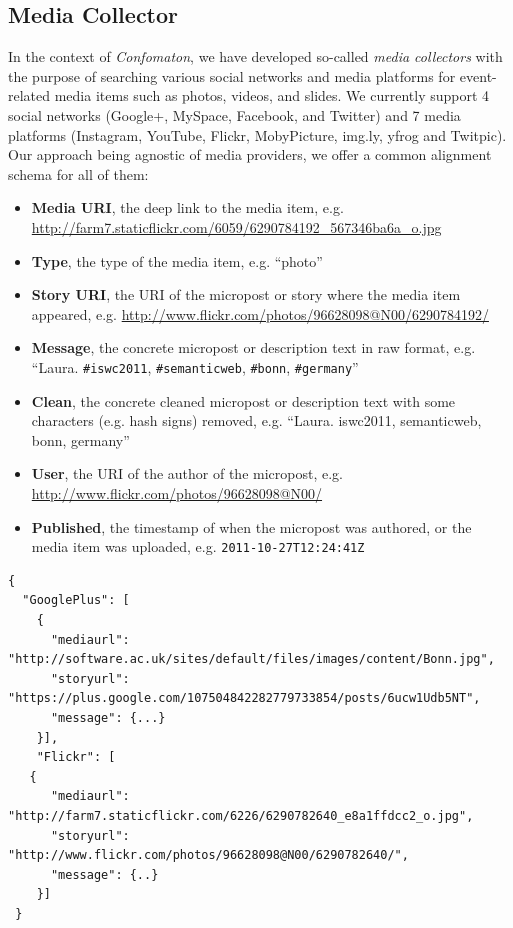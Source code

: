 \subsection{Media Collector}                                                \label{sec:media-collector}
In the context of \emph{Confomaton}, we have developed so-called \emph{media collectors} with the purpose of searching various social networks and media platforms for event-related media items such as photos, videos, and slides. We currently support 4 social networks (Google+, MySpace, Facebook, and Twitter) and 7 media platforms (Instagram, YouTube, Flickr, MobyPicture, img.ly, yfrog and Twitpic). Our approach being agnostic of media providers, we offer a common alignment schema for all of them:
\begin{itemize}
  \item	\textbf{Media URI}, the deep link to the media item, e.g. \url{http://farm7.staticflickr.com/6059/6290784192_567346ba6a_o.jpg}
  \item \textbf{Type}, the type of the media item, e.g.  ``photo''
  \item \textbf{Story URI}, the URI of the micropost or story where the media item appeared, e.g. \url{http://www.flickr.com/photos/96628098@N00/6290784192/}
  \item \textbf{Message}, the concrete micropost or description text in raw format, e.g.  ``Laura. \texttt{\#iswc2011}, \texttt{\#semanticweb}, \texttt{\#bonn}, \texttt{\#germany}''
  \item \textbf{Clean}, the concrete cleaned micropost or description text with some characters (e.g. hash signs) removed, e.g. ``Laura. iswc2011, semanticweb, bonn, germany''
  \item \textbf{User}, the URI of the author of the micropost, e.g. \url{http://www.flickr.com/photos/96628098@N00/}
  \item \textbf{Published}, the timestamp of when the micropost was authored, or the media item was uploaded, e.g. \texttt{2011-10-27T12:24:41Z}
\end{itemize}

\begin{lstlisting}[caption={Sample output of the media collector showing Google+ and Flickr results using \#iswc2011 as query term},label={lst:media}]
{
  "GooglePlus": [
    {
	  "mediaurl": "http://software.ac.uk/sites/default/files/images/content/Bonn.jpg",
	  "storyurl": "https://plus.google.com/107504842282779733854/posts/6ucw1Udb5NT",
	  "message": {...}
    }],
    "Flickr": [
   {
      "mediaurl": "http://farm7.staticflickr.com/6226/6290782640_e8a1ffdcc2_o.jpg",
      "storyurl": "http://www.flickr.com/photos/96628098@N00/6290782640/",
      "message": {..}
    }]
 }
\end{lstlisting}

